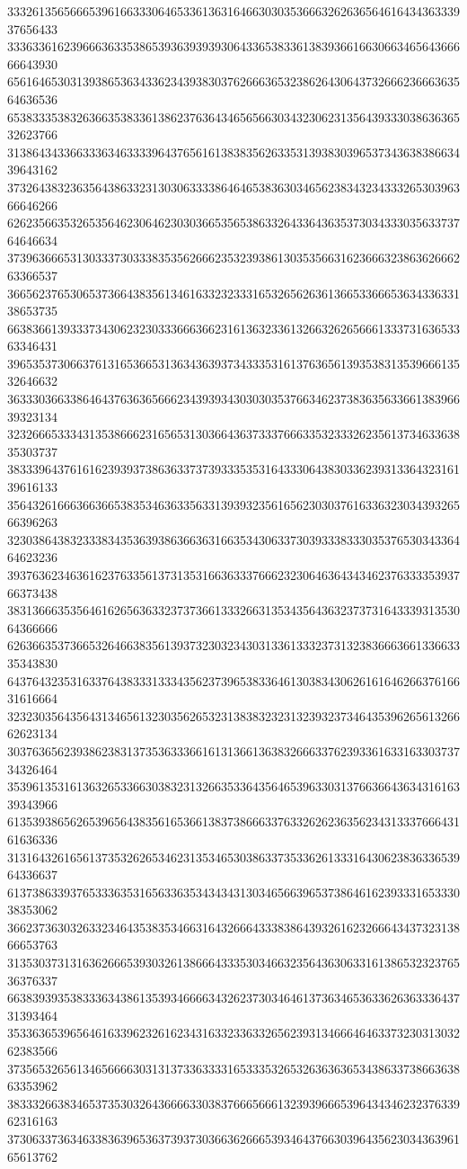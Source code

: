 33326135656665396166333064653361363164663030353666326263656461643436333937656433
33363361623966636335386539363939393064336538336138393661663066346564366666643930
65616465303139386536343362343938303762666365323862643064373266623666363564636536
65383335383263663538336138623763643465656630343230623135643933303863636532623766
31386434336633363463333964376561613838356263353139383039653734363838663439643162
37326438323635643863323130306333386464653836303465623834323433326530396366646266
62623566353265356462306462303036653565386332643364363537303433303563373764646634
37396366653130333730333835356266623532393861303535663162366632386362666263366537
36656237653065373664383561346163323233316532656263613665336665363433633138653735
66383661393337343062323033366636623161363233613266326265666133373163653363346431
39653537306637613165366531363436393734333531613763656139353831353966613532646632
36333036633864643763636566623439393430303035376634623738363563366138396639323134
32326665333431353866623165653130366436373337666335323332623561373463363835303737
38333964376161623939373863633737393335353164333064383033623931336432316139616133
35643261666366366538353463633563313939323561656230303761633632303439326566396263
32303864383233383435363938636636316635343063373039333833303537653034336464623236
39376362346361623763356137313531663633376662323064636434346237633335393766373438
38313666353564616265636332373736613332663135343564363237373164333931353064366666
62636635373665326466383561393732303234303133613332373132383666366133663335343830
64376432353163376438333133343562373965383364613038343062616164626637616631616664
32323035643564313465613230356265323138383232313239323734643539626561326662623134
30376365623938623831373536333661613136613638326663376239336163316330373734326464
35396135316136326533663038323132663533643564653963303137663664363431616339343966
61353938656265396564383561653661383738666337633262623635623431333766643161636336
31316432616561373532626534623135346530386337353362613331643062383633653964336637
61373863393765333635316563363534343431303465663965373864616239333165333038353062
36623736303263323464353835346631643266643338386439326162326664343732313866653763
31353037313163626665393032613866643335303466323564363063316138653232376536376337
66383939353833363438613539346666343262373034646137363465363362636333643731393464
35336365396564616339623261623431633233633265623931346664646337323031303262383566
37356532656134656666303131373363333165333532653263636365343863373866363863353962
38333266383465373530326436666330383766656661323939666539643434623237633962316163
37306337363463383639653637393730366362666539346437663039643562303436396165613762
